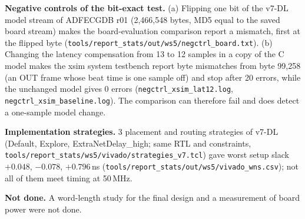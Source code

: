 \begin{finalpart}
\begin{table}[t]
\fb
\caption{\fb Re-baselined mid-term objectives O3 and O4 (\cref{tab:objective_status}). \textbf{[L3/L4/L5]} Source: \texttt{tools/report\_stats/out/hw\_table.csv}, Tab.~\ref{tab:hw_margin}.}
\label{tab:o3o4}
\centering
{}
\end{table}

\noindent\textbf{Negative controls of the bit-exact test.} (a) Flipping one bit of the v7-DL model stream of ADFECGDB r01 (2,466,548 bytes, MD5 equal to the saved board stream) makes the board-evaluation comparison report a mismatch, first at the flipped byte (\texttt{tools/report\_stats/out/ws5/negctrl\_board.txt}). (b) Changing the latency compensation from 13 to 12 samples in a copy of the C model makes the xsim system testbench report byte mismatches from byte 99,258 (an OUT frame whose beat time is one sample off) and stop after 20 errors, while the unchanged model gives 0 errors (\texttt{negctrl\_xsim\_lat12.log}, \texttt{negctrl\_xsim\_baseline.log}). The comparison can therefore fail and does detect a one-sample model change.

\noindent\textbf{Implementation strategies.} 3 placement and routing strategies of v7-DL (Default, Explore, ExtraNetDelay\_high; same RTL and constraints, \texttt{tools/report\_stats/ws5/vivado/strategies\_v7.tcl}) gave worst setup slack $+0.048$, $-0.078$, $+0.796$\,ns (\texttt{tools/report\_stats/out/ws5/vivado\_wns.csv}); not all of them meet timing at 50\,MHz.

\noindent\textbf{Not done.} A word-length study for the final design and a measurement of board power were not done.
\end{finalpart}
